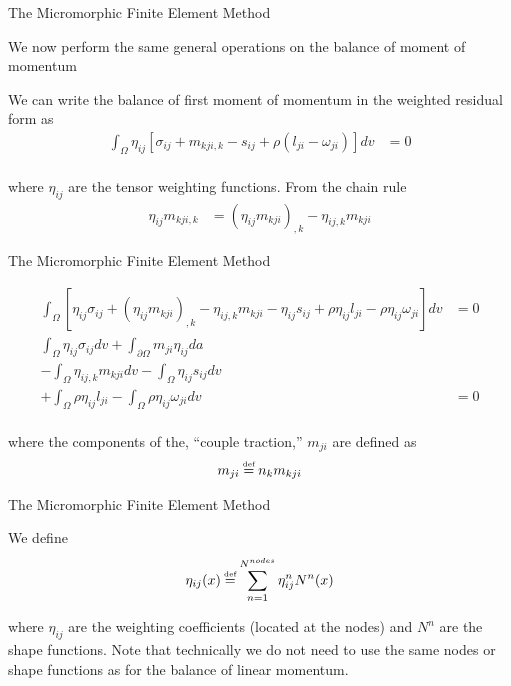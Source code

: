 \documentclass[11pt]{beamer}
\newcommand\defeq{\mathrel{\stackrel{\makebox[0pt]{\mbox{\normalfont\tiny def}}}{=}}}
\begin{document}
\begin{frame}{The Micromorphic Finite Element Method}

We now perform the same general operations on the balance of moment of momentum

We can write the balance of first moment of momentum in the weighted residual form as
\begin{align*}
\int_{\Omega} \eta_{ij} \left[\sigma_{ij} + m_{kji,k} - s_{ij} + \rho\left(l_{ji} - \omega_{ji}\right) \right] dv&= 0\\
\end{align*}

where $\eta_{ij}$ are the tensor weighting functions. From the chain rule
\begin{align*}
\eta_{ij} m_{kji,k} &= \left(\eta_{ij} m_{kji}\right)_{,k} - \eta_{ij,k} m_{kji}
\end{align*}

\end{frame}

\begin{frame}{The Micromorphic Finite Element Method}

\begin{align*}
\int_{\Omega} \left[\eta_{ij} \sigma_{ij} + \left(\eta_{ij} m_{kji}\right)_{,k} - \eta_{ij,k} m_{kji} - \eta_{ij} s_{ij} + \rho \eta_{ij} l_{ji} - \rho \eta_{ij} \omega_{ji} \right] dv&= 0\\
\int_{\Omega} \eta_{ij} \sigma_{ij} dv + \int_{\partial \Omega} m_{ji} \eta_{ij} da&\\
- \int_{\Omega} \eta_{ij,k} m_{kji}dv - \int_{\Omega} \eta_{ij} s_{ij}dv&\\
 + \int_{\Omega} \rho \eta_{ij} l_{ji} - \int_{\Omega} \rho \eta_{ij} \omega_{ji} dv&= 0\\
\end{align*}

where the components of the, ``couple traction,'' $m_{ji}$ are defined as
\begin{align*}
m_{ji} &\defeq n_k m_{kji}\\
\end{align*}

\end{frame}

\begin{frame}{The Micromorphic Finite Element Method}

We define
\begin{align*}
\eta_{ij}(x) &\defeq \sum_{n=1}^{N^{nodes}} \eta_{ij}^n N^n(x)\\
\end{align*}

where $\eta_{ij}$ are the weighting coefficients (located at the nodes) and $N^n$ are the shape functions. Note that technically we do not need to use the same nodes or shape functions as for the balance of linear momentum.

\end{frame}
\end{document}
